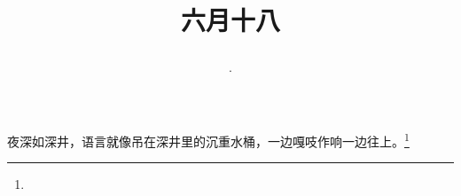 \title{\date[d=23,m=7,y=2024][year:cn-y,年,month:cn,day:cn,日,·,weekday]·六月十八 }
夜深如深井，语言就像吊在深井里的沉重水桶，一边嘎吱作响一边往上。\footnote{ }

